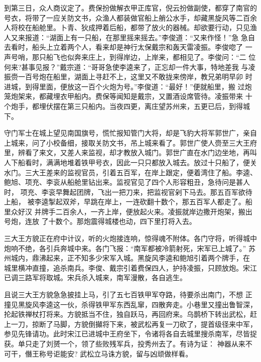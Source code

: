 到第三日，众人商议定了。费保扮做解衣甲正库官，倪云扮做副使，都穿了南官的
号衣，将带了一应关防文书，众渔人都装做官船上艄公水手，却藏黑旋风等二百余
人将校在船舱里。卜青、狄成押着后船，都带了放火的器械。却欲要行动，只见渔
人又来报道：“湖面上有一只船，在那里摇来摇去。”李俊道：“又来作怪！”急
急自去看时，船头上立着两个人，看来却是神行太保戴宗和轰天雷凌振。李俊唿了
一声号哨，那只船飞也似奔来庄上，到得岸边，上岸来，都相见了。李俊问：“二
位何来?甚事见报？”戴宗道：“哥哥急使李逵来了，正忘却一件大事，特地差我
与凌振赍一百号炮在船里，湖面上寻赶不上，这里又不敢拢来傍岸，教兄弟明早卯
时进城，到得里面，便放这一百个火炮为号。”李俊道：“最好！”便就船里，搬
过炮笼炮架来，都藏埋衣甲船内。费保等闻知是戴宗，又置酒设席管待。凌振带来
十个炮手，都埋伏摆在第三只船内。当夜四更，离庄望苏州来，五更已后，到得城
下。

守门军士在城上望见南国旗号，慌忙报知管门大将，却是飞豹大将军郭世广，亲自
上城来，问了小校备细，接取关防文书，吊上城来看了。郭世广使人赍至三大王府
里，辨看了来文，又差人来监视，却才教放入城门。郭世广直在水门边坐地，再叫
人下船看时，满满地堆着铁甲号衣，因此一只只都放入城去。放过十只船了，便关
水门。三大王差来的监视官员，引着五百军，在岸上跟定，便着湾住了船。李逵、
鲍旭、项充、李衮从船舱里钻出来。监视官见了四个人形容粗丑，急待问是甚人时，
项充、李衮早舞起团牌，飞出一把刀来，把监视官剁下马去。那五百军欲待上船，
被李逵掣起双斧，早跳在岸上，一连砍翻十数个，那五百军人都走了。船里众好汉
并牌手二百余人，一齐上岸，便放起火来。凌振就岸边撒开炮架，搬出号炮，连放
了十数个。那炮震得城楼也动，四下里打将入去。

三大王方貌正在府中计议，听的火炮接连响，惊得魂不附体。各门守将，听得城中
炮响不绝，各引兵奔城中来。各门飞报：“南军都被冷箭射死，宋军已上城了。”
苏州城内，鼎沸起来，正不知多少宋军入城。黑旋风李逵和鲍旭引着两个牌手，在
城里横冲直撞，追杀南兵。李俊、戴宗引着费保四人，护持凌振，只顾放炮。宋江
已调三路军将取城。宋兵杀入城来，南军漫散，各自逃生。

且说三大王方貌急急披挂上马，引了五七百铁甲军夺路，待要杀出南门，不想
正撞见黑旋风李逵这一伙，杀得铁甲军东西乱窜，四散奔走。小巷里又撞出鲁智深，
抡起铁禅杖打将来。方貌抵当不住，独自跃马，再回府来。乌鹊桥下转出武松，赶
上一刀，掠断了马脚，方貌倒攧将下来，被武松再复一刀砍了，提首级径来中军，
参见先锋请功。此时宋江已进城中王府坐下，令诸将各自去城里搜杀南军，尽皆捉
获。单只走了刘赟一个，领了些败残军兵，投秀州去了。有诗为证：
神器从来不可干，僭王称号讵能安?
武松立马诛方貌，留与凶顽做样看。

